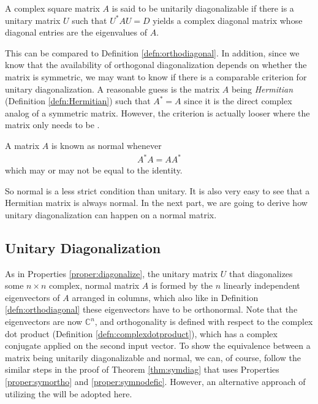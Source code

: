 \begin{defn}
\label{defn:unitarydiag}
A complex square matrix $A$ is said to be unitarily diagonalizable if there is a unitary matrix $U$ such that $U^* AU = D$ yields a complex diagonal matrix whose diagonal entries are the eigenvalues of $A$.
\end{defn}
This can be compared to Definition \ref{defn:orthodiagonal}. In addition, since we know that the availability of orthogonal diagonalization depends on whether the matrix is symmetric, we may want to know if there is a comparable criterion for unitary diagonalization. A reasonable guess is the matrix $A$ being \textit{Hermitian} (Definition \ref{defn:Hermitian}) such that $A^* = A$ since it is the direct complex analog of a symmetric matrix. However, the criterion is actually looser where the matrix only needs to be .
\begin{defn}
A matrix $A$ is known as normal whenever
\begin{align}
A^*A = AA^*    
\end{align}
which may or may not be equal to the identity.
\end{defn}
So normal is a less strict condition than unitary. It is also very easy to see that a Hermitian matrix is always normal. In the next part, we are going to derive how unitary diagonalization can happen on a normal matrix.

\subsection{Unitary Diagonalization}

As in Properties \ref{proper:diagonalize}, the unitary matrix $U$ that diagonalizes some $n \times n$ complex, normal matrix $A$ is formed by the $n$ linearly independent eigenvectors of $A$ arranged in columns, which also like in Definition \ref{defn:orthodiagonal} these eigenvectors have to be orthonormal. Note that the eigenvectors are now $\mathbb{C}^n$, and orthogonality is defined with respect to the complex dot product (Definition \ref{defn:complexdotproduct}), which has a complex conjugate applied on the second input vector. To show the equivalence between a matrix being unitarily diagonalizable and normal, we can, of course, follow the similar steps in the proof of Theorem \ref{thm:symdiag} that uses Properties \ref{proper:symortho} and \ref{proper:symnodefic}. However, an alternative approach of utilizing the  will be adopted here.

